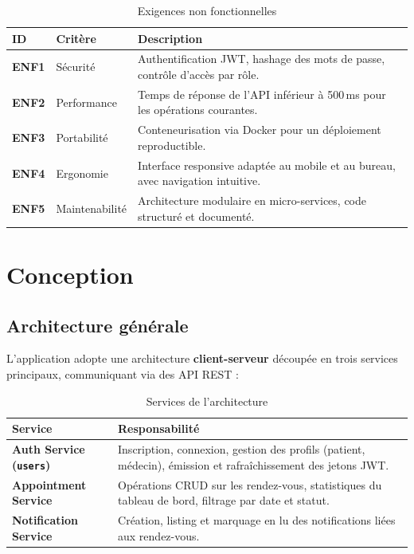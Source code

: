 \documentclass[12pt, a4paper]{article}
\begin{document}
\begin{table}[h!]
\centering
\caption{Exigences non fonctionnelles}
\label{tab:enf}
\small
\begin{tabular}{>{\bfseries}p{1cm} p{3.5cm} p{8.5cm}}
\toprule
ID & Critère & Description \\
\midrule
ENF1 & Sécurité & Authentification JWT, hashage des mots de passe, contrôle d'accès par rôle. \\
ENF2 & Performance & Temps de réponse de l'API inférieur à 500\,ms pour les opérations courantes. \\
ENF3 & Portabilité & Conteneurisation via Docker pour un déploiement reproductible. \\
ENF4 & Ergonomie & Interface responsive adaptée au mobile et au bureau, avec navigation intuitive. \\
ENF5 & Maintenabilité & Architecture modulaire en micro-services, code structuré et documenté. \\
\bottomrule
\end{tabular}
\end{table}

\section{Conception}

\subsection{Architecture générale}

L'application adopte une architecture \textbf{client-serveur} découpée en trois services principaux, communiquant via des API REST :

\begin{table}[h!]
\centering
\caption{Services de l'architecture}
\label{tab:archi}
\small
\begin{tabular}{>{\bfseries}p{4cm} p{9cm}}
\toprule
Service & Responsabilité \\
\midrule
Auth Service (\texttt{users}) & Inscription, connexion, gestion des profils (patient, médecin), émission et rafraîchissement des jetons JWT. \\
Appointment Service & Opérations CRUD sur les rendez-vous, statistiques du tableau de bord, filtrage par date et statut. \\
Notification Service & Création, listing et marquage en lu des notifications liées aux rendez-vous. \\
\bottomrule
\end{tabular}
\end{table}
\end{document}
